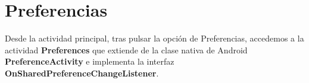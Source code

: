 \begin{figure}[h]
	\centering	
	 \hspace*{0.5cm}
\end{figure}

\section{Preferencias}

Desde la actividad principal, tras pulsar la opción de Preferencias, accedemos a la actividad \textbf{Preferences} que extiende de la clase nativa de Android  \textbf{PreferenceActivity} e implementa la interfaz \textbf{OnSharedPreferenceChangeListener}.
\newline

